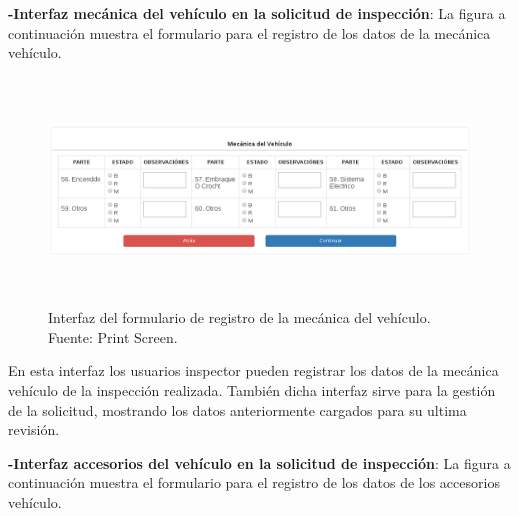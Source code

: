 \textbf{-Interfaz mecánica del vehículo en la solicitud de inspección}: La figura a continuación muestra el formulario para el registro de los datos de la mecánica vehículo.

\begin{figure}[H]
\begin{center}
	\includegraphics[width=\textwidth,height=6cm]{img/interfaces/registro_mecanica_vehiculo.png}
\end{center}
\caption{Interfaz del formulario de registro de la mecánica del vehículo. Fuente: Print Screen.}
\label{fig:interfaz_registro_mecanica_vehiculo}
\end{figure}

En esta interfaz los usuarios inspector pueden registrar los datos de la mecánica vehículo de la inspección realizada. También dicha interfaz sirve para la gestión de la solicitud, mostrando los datos anteriormente cargados para su ultima revisión.

\textbf{-Interfaz accesorios del vehículo en la solicitud de inspección}: La figura a continuación muestra el formulario para el registro de los datos de los accesorios vehículo.


